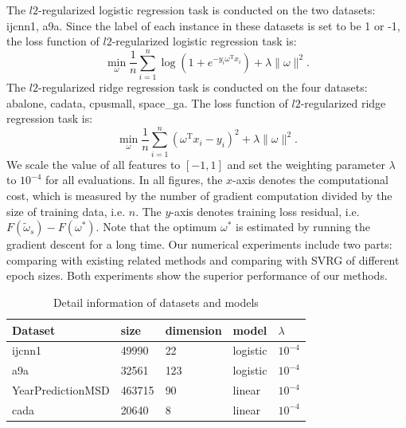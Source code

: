 \documentclass[conference]{IEEEtran}
\begin{document}
 The $l2$-regularized logistic regression task is conducted on the two datasets: ijcnn1, a9a. Since the label of each instance in these datasets is set to be 1 or -1, the loss function of $l2$-regularized logistic regression task is:
\begin{equation}
\label{logistic_reg}
\min\limits_\omega \frac{1}{n}\sum\limits_{i=1}^n \log(1+e^{-y_i \omega^\mathrm{T} x_i }) + \lambda \parallel \omega \parallel^2.
\end{equation}
The $l2$-regularized ridge regression task is conducted on the four datasets: abalone, cadata, cpusmall, space\_ga. The loss function of $l2$-regularized ridge regression task is:
\begin{equation}
\label{ridge_reg}
\min\limits_\omega \frac{1}{n}\sum\limits_{i=1}^n\left(\omega^{\mathrm{T}}x_i-y_i\right)^2 + \lambda \parallel \omega \parallel^2.
\end{equation}
We scale the value of all features to $[-1,1]$ and set the weighting parameter $\lambda$ to $10^{-4}$ for all evaluations. 
In all figures, the $x$-axis denotes the computational cost, which is measured by the number of gradient computation divided by the size of training data, i.e. $n$. The $y$-axis denotes training loss residual, i.e. $F(\tilde{\omega}_s) - F(\omega^{*})$. Note that the optimum $\omega^*$ is estimated by running the gradient descent for a long time. Our numerical experiments include two parts: comparing with existing related methods and comparing with SVRG of different epoch sizes. Both experiments show the superior performance of our methods. 

\begin{table}[]
\centering
\caption{Detail information of datasets and models}
\label{data information}
\begin{tabular}{|l|l|l|l|l|}
\hline
Dataset           & size & dimension & model & $\lambda$ \\ \hline
ijcnn1            &  49990 &  22 &   logistic    &  $10^{-4}$         \\
a9a               &   32561&123   &     logistic  &      $10^{-4}$     \\ 
YearPredictionMSD & 463715  &  90 &    linear  &      $10^{-4}$     \\
cada              & 20640  &8   &     linear  &    $10^{-4}$       \\ \hline
\end{tabular}
\end{table}
\end{document}
